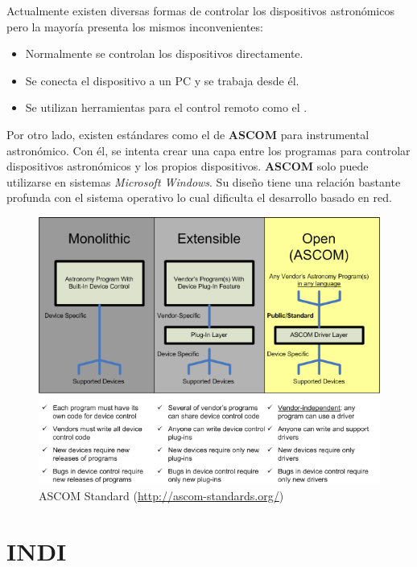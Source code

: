 Actualmente existen diversas formas de controlar los dispositivos astronómicos pero la mayoría presenta los mismos inconvenientes:

\begin{itemize}
  \item Normalmente se controlan los dispositivos directamente.
  \item Se conecta el dispositivo a un PC y se trabaja desde él.
  \item Se utilizan herramientas para el control remoto como el .
\end{itemize}

\bigskip

Por otro lado, existen estándares como el de \textbf{ASCOM} para instrumental astronómico. Con él, se intenta crear una capa entre los programas para controlar dispositivos astronómicos y los propios dispositivos. \textbf{ASCOM} solo puede utilizarse en sistemas \textit{Microsoft Windows}. Su diseño tiene una relación bastante profunda con el sistema operativo lo cual dificulta el desarrollo basado en red.

\bigskip
\begin{figure}[!ht]
  \begin{center}
    \includegraphics[scale=0.5]{../images/ascom.png}
    \caption{ASCOM Standard (\href{http://ascom-standards.org/}{http://ascom-standards.org/})}
    \label{fig:ascom}
  \end{center}
\end{figure}


\newpage
\section{INDI}

